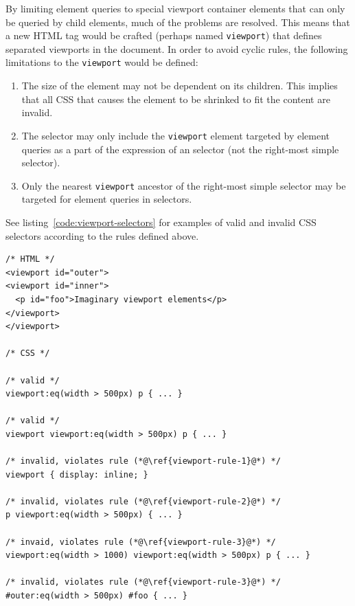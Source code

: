 \documentclass[a4paper,11pt]{kth-mag}
\newcommand{\code}[1]{\texttt{#1}}
\begin{document}
        By limiting element queries to special \gls{viewport} container \glspl{element} that can only be queried by child \glspl{element}, much of the problems are resolved.
        This means that a new \gls{HTML} tag would be crafted (perhaps named \code{viewport}) that defines separated \glspl{viewport} in the \gls{document}.
        In order to avoid cyclic rules, the following limitations to the \code{viewport} would be defined:
        \begin{enumerate}
          \item\label{viewport-rule-1} The size of the \gls{element} may not be dependent on its children. This implies that all \gls{CSS} that causes the \gls{element} to be shrinked to fit the content are invalid.
          \item\label{viewport-rule-2} The selector may only include the \code{viewport} \gls{element} targeted by element queries as a part of the expression of an selector (not the right-most simple selector).
          \item\label{viewport-rule-3} Only the nearest \code{viewport} ancestor of the right-most simple selector may be targeted for element queries in selectors.
        \end{enumerate}
        See listing~\ref{code:viewport-selectors} for examples of valid and invalid CSS selectors according to the rules defined above.
        \begin{lstlisting}[caption={Examples of valid and invalid selectors with the imaginary \code{viewport} element.}, captionpos=b, label={code:viewport-selectors}]
/* HTML */
<viewport id="outer">
<viewport id="inner">
  <p id="foo">Imaginary viewport elements</p>
</viewport>
</viewport>

/* CSS */

/* valid */
viewport:eq(width > 500px) p { ... }

/* valid */
viewport viewport:eq(width > 500px) p { ... }

/* invalid, violates rule (*@\ref{viewport-rule-1}@*) */
viewport { display: inline; }

/* invalid, violates rule (*@\ref{viewport-rule-2}@*) */
p viewport:eq(width > 500px) { ... }

/* invaid, violates rule (*@\ref{viewport-rule-3}@*) */
viewport:eq(width > 1000) viewport:eq(width > 500px) p { ... }

/* invalid, violates rule (*@\ref{viewport-rule-3}@*) */
#outer:eq(width > 500px) #foo { ... }
        \end{lstlisting}        
\end{document}
